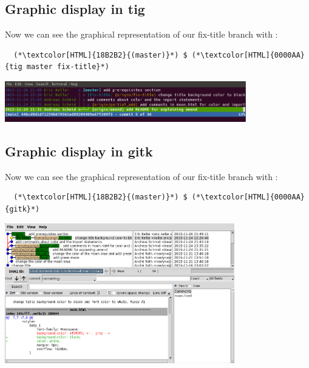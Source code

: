 \subsection{Graphic display in tig}
\begin{frame}[fragile]
  \subslidetitle

  Now we can see the graphical representation of our fix-title branch with :
  \begin{lstlisting}
  (*\textcolor[HTML]{18B2B2}{(master)}*) $ (*\textcolor[HTML]{0000AA}{tig master fix-title}*)
\end{lstlisting}

  \vspace{1em}

  \centerline{\includegraphics[width=10.5cm]{../screen/tig-fix-title.png}}

\end{frame}

\subsection{Graphic display in gitk}
\begin{frame}[fragile]
  \subslidetitle

  Now we can see the graphical representation of our fix-title branch with :
  \begin{lstlisting}
  (*\textcolor[HTML]{18B2B2}{(master)}*) $ (*\textcolor[HTML]{0000AA}{gitk}*)
\end{lstlisting}

  \vspace{1em}

  \centerline{\includegraphics[width=10cm]{../screen/gitk-fix-title.png}}

\end{frame}

